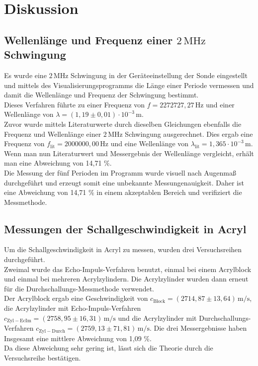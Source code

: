 \newpage
\section{Diskussion}
\label{sec:Diskussion}

\subsection{Wellenlänge und Frequenz einer $2 \, \si{\mega\hertz}$ Schwingung}

Es wurde eine $2 \, \si{\mega\hertz}$ Schwingung in der Geräteeinstellung der Sonde 
eingestellt und mittels des Visualisierungsprogramms die Länge einer Periode vermessen
und damit die Wellenlänge und Frequenz der Schwingung bestimmt.\\
Dieses Verfahren führte zu einer Frequenz von $f = 2 272 727,27 \, \si{\hertz}$ und einer
Wellenlänge von $\lambda = (1,19 \pm 0,01) \cdot 10^{-3} \, \si{\meter}$.\\
Zuvor wurde mittels Literaturwerte durch dieselben Gleichungen ebenfalls die Frequenz
und Wellenlänge einer $2 \, \si{\mega\hertz}$ Schwingung ausgerechnet. Dies ergab eine
Frequenz von $f_{\mathrm{lit}} = 2 000 000,00 \, \si{\hertz}$ und eine Wellenlänge von
$\lambda_{\mathrm{lit}} = 1,365 \cdot 10^{-3} \, \si{\m}$.\\
Wenn man nun Literaturwert und Messergebnis der Wellenlänge vergleicht, erhält man eine 
Abweichung von 14,71 \%.\\
Die Messung der fünf Perioden im Programm wurde visuell nach Augenmaß durchgeführt und
erzeugt somit eine unbekannte Messungenauigkeit. Daher ist eine Abweichung von 14,71 \%
in einem akzeptablen Bereich und verifiziert die Messmethode.\\

\subsection{Messungen der Schallgeschwindigkeit in Acryl}

Um die Schallgeschwindigkeit in Acryl zu messen, wurden drei Versuchsreihen durchgeführt.\\
Zweimal wurde das Echo-Impuls-Verfahren benutzt, einmal bei einem Acrylblock und einmal
bei mehreren Acrylzylindern. Die Acrylzylinder wurden dann erneut für die Durchschallungs-Messmethode
verwendet.\\
Der Acrylblock ergab eine Geschwindigkeit von $c_{\mathrm{Block}} = (2714,87 \pm 13,64) \, \si{\meter\per\second}$,
die Acrylzylinder mit Echo-Impuls-Verfahren $c_{\mathrm{Zyl-EcIm}} = (2758,95 \pm 16,31) \, \si{\meter\per\second}$
und die Acrylzylinder mit Durchschallungs-Verfahren $c_{\mathrm{Zyl-Durch}} = (2759,13 \pm 71,81) \, \si{\meter\per\second}$.
Die drei Messergebnisse haben Insgesamt eine mittlere Abweichung von 1,09 \%.\\
Da diese Abweichung sehr gering ist, lässt sich die Theorie durch die Versuchsreihe bestätigen.\\

